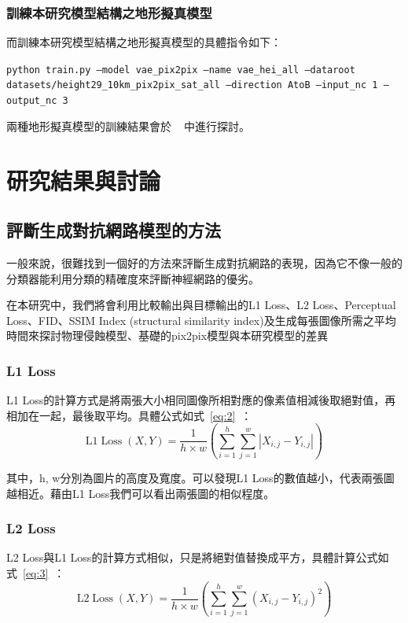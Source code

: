 \documentclass[a4paper, 12pt]{article}
\begin{document}
\subsubsection{訓練本研究模型結構之地形擬真模型}
而訓練本研究模型結構之地形擬真模型的具體指令如下：
\begin{center}
    \texttt{\small python train.py --model vae\_pix2pix --name vae\_hei\_all --dataroot datasets/height29\_10km\_pix2pix\_sat\_all --direction AtoB --input\_nc 1 --output\_nc 3}
\end{center}

兩種地形擬真模型的訓練結果會於\textbf{~~}中進行探討。

\section{研究結果與討論}
\label{sec:res}
\subsection{評斷生成對抗網路模型的方法}
一般來說，很難找到一個好的方法來評斷生成對抗網路的表現，因為它不像一般的分類器能利用分類的精確度來評斷神經網路的優劣。

在本研究中，我們將會利用比較輸出與目標輸出的L1 Loss、L2 Loss、Perceptual Loss、FID、SSIM Index (structural similarity index)及生成每張圖像所需之平均時間來探討物理侵蝕模型、基礎的pix2pix模型與本研究模型的差異

\subsubsection{L1 Loss}
L1 Loss的計算方式是將兩張大小相同圖像所相對應的像素值相減後取絕對值，再相加在一起，最後取平均。具體公式如式~\ref{eq:2}~：
\begin{equation}
    \mathrm{L} 1 \operatorname{Loss}(X, Y)=\frac{1}{h \times w}\left(\sum_{i=1}^{h} \sum_{j=1}^{w}\left|X_{i, j}-Y_{i, j}\right|\right)
    \label{eq:2}
\end{equation}

其中，h, w分別為圖片的高度及寬度。可以發現L1 Loss的數值越小，代表兩張圖越相近。藉由L1 Loss我們可以看出兩張圖的相似程度。

\subsubsection{L2 Loss}
L2 Loss與L1 Loss的計算方式相似，只是將絕對值替換成平方，具體計算公式如式~\ref{eq:3}~：
\begin{equation}
    \mathrm{L} 2 \operatorname{Loss}(X, Y)=\frac{1}{h \times w}\left(\sum_{i=1}^{h} \sum_{j=1}^{w}\left(X_{i, j}-Y_{i, j}\right)^{2}\right)
    \label{eq:3}
\end{equation}
\end{document}

